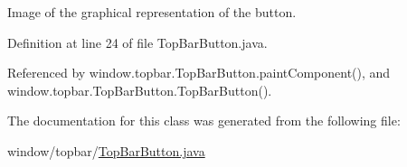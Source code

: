 Image of the graphical representation of the button. 



Definition at line 24 of file Top\-Bar\-Button.\-java.



Referenced by window.\-topbar.\-Top\-Bar\-Button.\-paint\-Component(), and window.\-topbar.\-Top\-Bar\-Button.\-Top\-Bar\-Button().



The documentation for this class was generated from the following file\-:\begin{DoxyCompactItemize}
\item 
window/topbar/\hyperlink{_top_bar_button_8java}{Top\-Bar\-Button.\-java}\end{DoxyCompactItemize}
